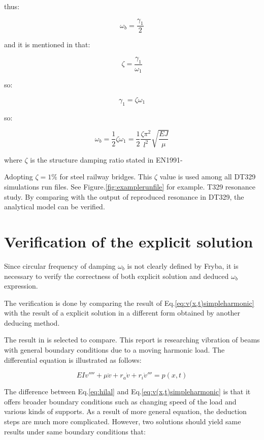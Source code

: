 thus:


\begin{equation}
    \omega_b = \frac{\gamma_1}{2}
\end{equation}

and it is mentioned in \cite[Eq.8]{abu2000vibration} that:

$$\zeta = \frac{\gamma_1}{\omega_1}$$

so:

$$\gamma_1 = \zeta\omega_1$$

so:

$$\omega_b = \frac{1}{2}\zeta\omega_1 = \frac{1}{2}\frac{\zeta\pi^2}{l^2}\sqrt{\frac{EJ}{\mu}}$$

where $\zeta$ is the structure damping ratio stated in EN1991-

Adopting $\zeta = 1\%$ for steel railway bridges. This $\zeta$ value is used among all DT329 simulations run files. See Figure.\ref{fig:examplerunfile} for example.
T329 resonance study. By comparing with the output of reproduced resonance in DT329, the analytical model can be verified.

\section{Verification of the explicit solution}
Since circular frequency of damping $\omega_b$ is not clearly defined by Fryba, it is necessary to verify the correctness of both explicit solution and deduced $\omega_b$ expression.

The verification is done by comparing the result of Eq.\ref{eq:v(x,t)simpleharmonic} with the result of a explicit solution in a different form obtained by another deducing method.  

The result in \cite{abu2000vibration} is selected to compare. This report is researching vibration of beams with general boundary conditions due to a moving harmonic load. The differential equation is illustrated as follows:

\begin{equation}\label{eq:hilal}
    EIv''''+\mu \ddot{v} + r_a \dot{v}+r_i \dot{v}''' = p(x,t)
\end{equation}

The difference between Eq.\ref{eq:hilal} and Eq.\ref{eq:v(x,t)simpleharmonic} is that it offers broader boundary conditions such as changing speed of the load and various kinds of supports. As a result of more general equation, the deduction steps are much more complicated. However, two solutions should yield same results under same boundary conditions that:

